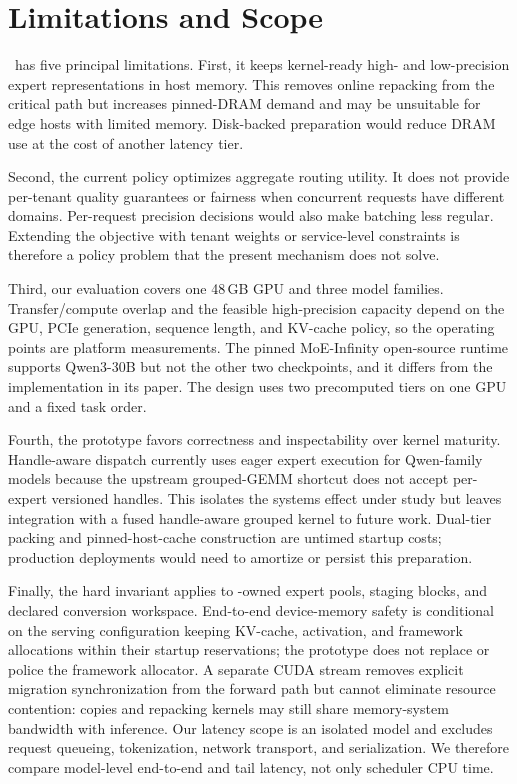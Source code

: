 \section{Limitations and Scope}
\label{sec:limitations}

\systemname\ has five principal limitations. First, it keeps kernel-ready high- and low-precision expert representations in host memory. This removes online repacking from the critical path but increases pinned-DRAM demand and may be unsuitable for edge hosts with limited memory. Disk-backed preparation would reduce DRAM use at the cost of another latency tier.

Second, the current policy optimizes aggregate routing utility. It does not provide per-tenant quality guarantees or fairness when concurrent requests have different domains. Per-request precision decisions would also make batching less regular. Extending the objective with tenant weights or service-level constraints is therefore a policy problem that the present mechanism does not solve.

Third, our evaluation covers one 48\,GB GPU and three model families. Transfer/compute overlap and the feasible high-precision capacity depend on the GPU, PCIe generation, sequence length, and KV-cache policy, so the operating points are platform measurements. The pinned MoE-Infinity open-source runtime supports Qwen3-30B but not the other two checkpoints, and it differs from the implementation in its paper. The design uses two precomputed tiers on one GPU and a fixed task order.

Fourth, the prototype favors correctness and inspectability over kernel maturity. Handle-aware dispatch currently uses eager expert execution for Qwen-family models because the upstream grouped-GEMM shortcut does not accept per-expert versioned handles. This isolates the systems effect under study but leaves integration with a fused handle-aware grouped kernel to future work. Dual-tier packing and pinned-host-cache construction are untimed startup costs; production deployments would need to amortize or persist this preparation.

Finally, the hard invariant applies to \systemname-owned expert pools, staging blocks, and declared conversion workspace. End-to-end device-memory safety is conditional on the serving configuration keeping KV-cache, activation, and framework allocations within their startup reservations; the prototype does not replace or police the framework allocator. A separate CUDA stream removes explicit migration synchronization from the forward path but cannot eliminate resource contention: copies and repacking kernels may still share memory-system bandwidth with inference. Our latency scope is an isolated model and excludes request queueing, tokenization, network transport, and serialization. We therefore compare model-level end-to-end and tail latency, not only scheduler CPU time.
